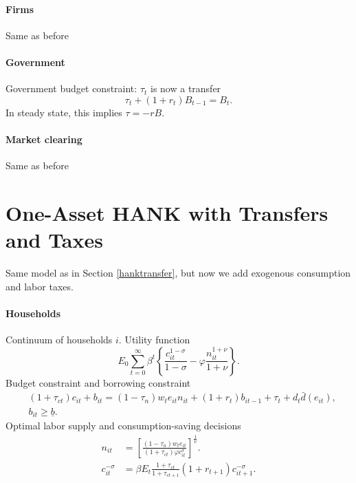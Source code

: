 \documentclass[11pt,a4paper]{article}
\begin{document}
\paragraph{Firms} Same as before

\paragraph{Government} Government budget constraint: $\tau_t$ is now a transfer
\begin{equation*}
\tau_t+(1+r_t)B_{t-1}=B_t.
\end{equation*}
In steady state, this implies $\tau=-rB$.

\paragraph{Market clearing} Same as before




\section{One-Asset HANK with Transfers and Taxes}
\label{hanktax}
Same model as in Section \ref{hanktransfer}, but now we add exogenous consumption and labor taxes.


\paragraph{Households}
Continuum of households $i$. Utility function
\begin{equation*}
E_0\sum_{t=0}^{\infty}\beta^t\left\{\frac{c_{it}^{1-\sigma}}{1-\sigma}-\varphi\frac{n_{it}^{1+\nu}}{1+\nu}\right\}.
\end{equation*}
Budget constraint and borrowing constraint
\begin{align*}
&(1+\tau_{ct})c_{it}+b_{it}=(1-\tau_{n})w_te_{it}n_{it}+(1+r_t)b_{it-1}+\tau_t+d_t\bar{d}(e_{it}),\\
&b_{it}\geq\underline{b}.
\end{align*}
Optimal labor supply and consumption-saving decisions
\begin{align*}
n_{it}&=\left[\frac{(1-\tau_n)w_te_{it}}{(1+\tau_{ct})\varphi c_{it}^{\sigma}}\right]^{\frac{1}{\nu}}.\\
c_{it}^{-\sigma}&=\beta E_t\frac{1+\tau_{ct}}{1+\tau_{ct+1}}(1+r_{t+1})c_{it+1}^{-\sigma}.
\end{align*}
\end{document}
